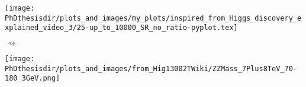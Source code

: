\begin{frame}
\transdissolve
{}
\begin{center}
\begin{minipage}[c]{.4\textwidth}
\texttt{[image: \\PhDthesisdir/plots\_and\_images/my\_plots/inspired\_from\_Higgs\_discovery\_explained\_video\_3/25-up\_to\_10000\_SR\_no\_ratio-pyplot.tex]}
\end{minipage}
\begin{minipage}[c]{.1\textwidth}
\begin{center}
\huge$\rightsquigarrow$
\end{center}
\end{minipage}
\begin{minipage}[c]{.4\textwidth}
\texttt{[image: \\PhDthesisdir/plots\_and\_images/from\_Hig13002TWiki/ZZMass\_7Plus8TeV\_70-180\_3GeV.png]}
\end{minipage}
\end{center}
\end{frame}
